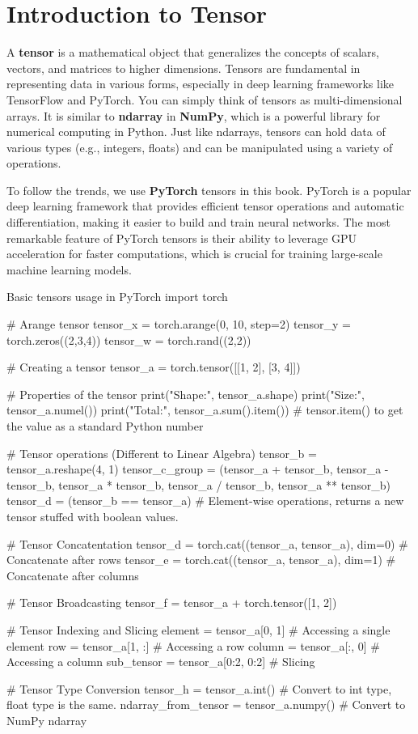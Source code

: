 \section{Introduction to Tensor}

A \textbf{tensor} is a mathematical object that generalizes the concepts of scalars, vectors, and matrices to higher dimensions. Tensors are fundamental in representing data in various forms, especially in deep learning frameworks like TensorFlow and PyTorch. You can simply think of tensors as multi-dimensional arrays. It is similar to \textbf{ndarray} in \textbf{NumPy}, which is a powerful library for numerical computing in Python. Just like ndarrays, tensors can hold data of various types (e.g., integers, floats) and can be manipulated using a variety of operations.

To follow the trends, we use \textbf{PyTorch} tensors in this book. PyTorch is a popular deep learning framework that provides efficient tensor operations and automatic differentiation, making it easier to build and train neural networks. The most remarkable feature of PyTorch tensors is their ability to leverage GPU acceleration for faster computations, which is crucial for training large-scale machine learning models.

\begin{pythoncode}{Basic tensors usage in PyTorch}
import torch

# Arange tensor
tensor_x = torch.arange(0, 10, step=2)
tensor_y = torch.zeros((2,3,4))
tensor_w = torch.rand((2,2))

# Creating a tensor
tensor_a = torch.tensor([[1, 2], [3, 4]])

# Properties of the tensor
print("Shape:", tensor_a.shape)
print("Size:", tensor_a.numel())
print("Total:", tensor_a.sum().item())
# tensor.item() to get the value as a standard Python number

# Tensor operations (Different to Linear Algebra)
tensor_b = tensor_a.reshape(4, 1)
tensor_c_group = (tensor_a + tensor_b, tensor_a - tensor_b, tensor_a * tensor_b, tensor_a / tensor_b, tensor_a ** tensor_b)
tensor_d = (tensor_b == tensor_a)  # Element-wise operations, returns a new tensor stuffed with boolean values.

# Tensor Concatentation
tensor_d = torch.cat((tensor_a, tensor_a), dim=0)  # Concatenate after rows
tensor_e = torch.cat((tensor_a, tensor_a), dim=1)  # Concatenate after columns

# Tensor Broadcasting
tensor_f = tensor_a + torch.tensor([1, 2])

# Tensor Indexing and Slicing
element = tensor_a[0, 1]  # Accessing a single element
row = tensor_a[1, :]      # Accessing a row
column = tensor_a[:, 0]   # Accessing a column
sub_tensor = tensor_a[0:2, 0:2]  # Slicing

# Tensor Type Conversion
tensor_h = tensor_a.int()    # Convert to int type, float type is the same.
ndarray_from_tensor = tensor_a.numpy()  # Convert to NumPy ndarray
\end{pythoncode}

